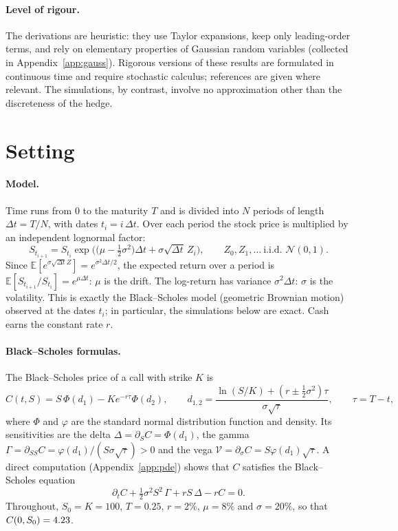 \documentclass[11pt,a4paper]{article}
\newcommand{\E}{\mathbb{E}}
\begin{document}
\paragraph{Level of rigour.} The derivations are heuristic: they use Taylor expansions, keep only leading-order terms, and rely on elementary properties of Gaussian random variables (collected in Appendix~\ref{app:gauss}). Rigorous versions of these results are formulated in continuous time and require stochastic calculus; references are given where relevant. The simulations, by contrast, involve no approximation other than the discreteness of the hedge.

\section{Setting}\label{sec:setting}

\paragraph{Model.} Time runs from $0$ to the maturity $T$ and is divided into $N$ periods of length $\Delta t = T/N$, with dates $t_i = i\,\Delta t$. Over each period the stock price is multiplied by an independent lognormal factor:
\begin{equation}\label{eq:model}
  S_{t_{i+1}} = S_{t_i}\exp\!\Big(\big(\mu - \tfrac12\sigma^2\big)\Delta t + \sigma\sqrt{\Delta t}\,Z_i\Big),
  \qquad Z_0, Z_1, \dots \ \text{i.i.d.\ } \mathcal N(0,1).
\end{equation}
Since $\E[e^{\sigma\sqrt{\Delta t}Z}] = e^{\sigma^2\Delta t/2}$, the expected return over a period is $\E[S_{t_{i+1}}/S_{t_i}] = e^{\mu\Delta t}$: $\mu$ is the drift. The log-return has variance $\sigma^2\Delta t$: $\sigma$ is the volatility. This is exactly the Black--Scholes model (geometric Brownian motion) observed at the dates $t_i$; in particular, the simulations below are exact. Cash earns the constant rate $r$.

\paragraph{Black--Scholes formulas.} The Black--Scholes price of a call with strike $K$ is
\[
  C(t,S) = S\,\Phi(d_1) - K e^{-r\tau}\Phi(d_2),\qquad
  d_{1,2} = \frac{\ln(S/K) + (r\pm\tfrac12\sigma^2)\tau}{\sigma\sqrt\tau},\qquad \tau = T-t,
\]
where $\Phi$ and $\varphi$ are the standard normal distribution function and density. Its sensitivities are the delta $\Delta = \partial_S C = \Phi(d_1)$, the gamma $\Gamma = \partial_{SS} C = \varphi(d_1)/(S\sigma\sqrt\tau) > 0$ and the vega $\mathcal V = \partial_\sigma C = S\varphi(d_1)\sqrt\tau$. A direct computation (Appendix~\ref{app:pde}) shows that $C$ satisfies the Black--Scholes equation
\begin{equation}\label{eq:bspde}
  \partial_t C + \tfrac12\sigma^2 S^2\,\Gamma + rS\,\Delta - rC = 0 .
\end{equation}
Throughout, $S_0 = K = 100$, $T = 0.25$, $r = 2\%$, $\mu = 8\%$ and $\sigma = 20\%$, so that $C(0,S_0) = 4.23$.
\end{document}
